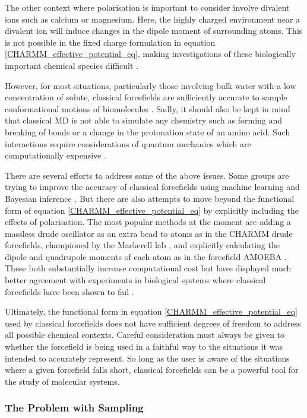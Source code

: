 The other context where polarisation is important to consider involve divalent ions such as calcium or magnesium. Here, the highly charged environment near a divalent ion will induce changes in the dipole moment of surrounding atoms. This is not possible in the fixed charge formulation in equation \ref{CHARMM_effective_potential_eq}, making investigations of these biologically important chemical species difficult \cite{mamatkulov2013, bergonzo2016}.

However, for most situations, particularly those involving bulk water with a low concentration of solute, classical forcefields are sufficiently accurate to sample conformational motions of biomolecules \cite{hollingsworth2018}. Sadly, it should also be kept in mind that classical MD is not able to simulate any chemistry such as forming and breaking of bonds or a change in the protonation state of an amino acid. Such interactions require considerations of quantum mechanics which are computationally expensive \cite{melo2018}.

There are several efforts to address some of the above issues. Some groups are trying to improve the accuracy of classical forcefields using machine learning and Bayesian inference \cite{nerenberg2018}. But there are also attempts to move beyond the functional form of equation \ref{CHARMM_effective_potential_eq} by explicitly including the effects of polarisation. The most popular methods at the moment are adding a massless drude oscillator as an extra bead to atoms as in the CHARMM drude forcefields, championed by the Mackerell lab \cite{lin2020}, and explicitly calculating the dipole and quadrupole moments of each atom as in the forcefield AMOEBA \cite{shi2013a}. These both substantially increase computational cost but have displayed much better agreement with experiments in biological systems where classical forcefields have been shown to fail \cite{ngo2021, li2017, shi2013}. 

Ultimately, the functional form in equation \ref{CHARMM_effective_potential_eq} used by classical forcefields does not have sufficient degrees of freedom to address all possible chemical contexts. Careful consideration must always be given to whether the forcefield is being used in a faithful way to the situations it was intended to accurately represent. So long as the user is aware of the situations where a given forcefield falls short, classical forcefields can be a powerful tool for the study of molecular systems.

\subsubsection{The Problem with Sampling}
\label{sampling_problem}

